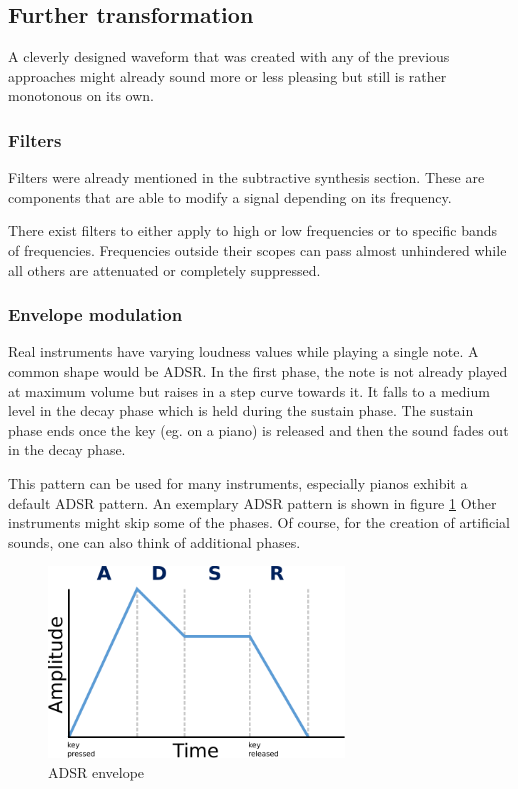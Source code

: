 		\subsection{Further transformation}

			A cleverly designed waveform that was created with any of the previous approaches might already sound more or less pleasing but still is rather monotonous on its own.
			
			\subsubsection{Filters} 
				\label{subsec:filters}
				Filters were already mentioned in the subtractive synthesis section. 
				These are components that are able to modify a signal depending on its frequency.
				
				There exist filters to either apply to high or low frequencies or to specific bands of frequencies.
				Frequencies outside their scopes can pass almost unhindered while all others are attenuated or completely suppressed.
			\subsubsection{Envelope modulation}
				Real instruments have varying loudness values while playing a single note.
				A common shape would be	\ac{ADSR}.
				In the first phase, the note is not already played at maximum volume but raises in a step curve towards it.
				It falls to a medium level in the decay phase which is held during the sustain phase.
				The sustain phase ends once the key (eg. on a piano) is released and then the sound fades out in the decay phase.
				
				This pattern can be used for many instruments, especially pianos exhibit a default \ac{ADSR} pattern. An exemplary \ac{ADSR} pattern is shown in figure \ref{fig:adsr}
				Other instruments might skip some of the phases. 
				Of course, for the creation of artificial sounds, one can also think of additional phases.
				
				\begin{figure}[!h]
				\centering
					\includegraphics[width=0.70\textwidth]{images/adsr.pdf}
				\caption{\ac{ADSR} envelope}
				\label{fig:adsr}
				\end{figure}
				
